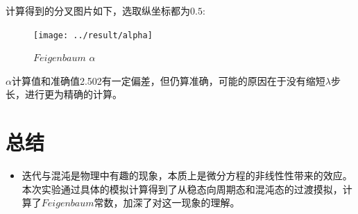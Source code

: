 \documentclass[UTF8]{ctexart}
\begin{document}
\begin{flushleft}
	计算得到的分叉图片如下，选取纵坐标都为$0.5$:
\end{flushleft}

		\begin{figure}[H]
		\centering\texttt{[image: ../result/alpha]}
		\caption{$Feigenbaum\,\,\alpha$}
	\end{figure}

	



\begin{flushleft}
	$\alpha$计算值和准确值2.502有一定偏差，但仍算准确，可能的原因在于没有缩短$\lambda$步长，进行更为精确的计算。
\end{flushleft}

%		
	
	
	\section{总结}

	\begin{itemize}
		\item 迭代与混沌是物理中有趣的现象，本质上是微分方程的非线性性带来的效应。本次实验通过具体的模拟计算得到了从稳态向周期态和混沌态的过渡摸拟，计算了$Feigenbaum$常数，加深了对这一现象的理解。
		
	\end{itemize}
\end{document}

